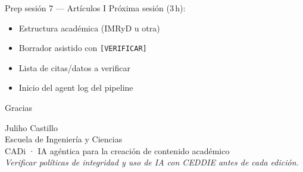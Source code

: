 \documentclass[aspectratio=169,11pt]{beamer}
\begin{document}
\begin{frame}{Prep sesión 7 --- Artículos I}
Próxima sesión (3\,h):
\begin{itemize}
\item Estructura académica (IMRyD u otra)
\item Borrador asistido con \texttt{[VERIFICAR]}
\item Lista de citas/datos a verificar
\item Inicio del agent log del pipeline
\end{itemize}
\end{frame}

\begin{frame}{Gracias}
\begin{center}
{\Large Juliho Castillo}\\[0.5em]
Escuela de Ingeniería y Ciencias\\[1em]
CADi · IA agéntica para la creación de contenido académico\\[1.5em]
{\small \emph{Verificar políticas de integridad y uso de IA con CEDDIE antes de cada edición.}}
\end{center}
\end{frame}
\end{document}
